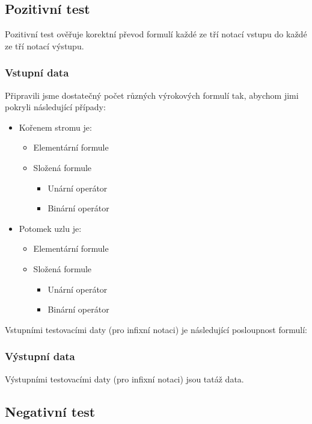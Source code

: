 \documentclass[thesis=B,czech,hidelinks]{thesis}[2012/06/26]
\begin{document}
\subsection{Pozitivní test}

Pozitivní test ověřuje korektní převod formulí každé ze tří notací vstupu do každé ze tří notací výstupu.

\subsubsection{Vstupní data}

Připravili jsme dostatečný počet různých výrokových formulí tak, abychom jimi pokryli následující případy:

\begin{itemize}
	\item Kořenem stromu je:
	\begin{itemize}
		\item Elementární formule
		\item Složená formule
		\begin{itemize}
			\item Unární operátor
			\item Binární operátor
		\end{itemize}
	\end{itemize}
	\item Potomek uzlu je:
	\begin{itemize}
		\item Elementární formule
		\item Složená formule
		\begin{itemize}
			\item Unární operátor
			\item Binární operátor
		\end{itemize}
	\end{itemize}
\end{itemize}

Vstupními testovacími daty (pro infixní notaci) je následující posloupnost formulí:


\subsubsection{Výstupní data}

Výstupními testovacími daty (pro infixní notaci) jsou tatáž data.

\subsection{Negativní test}
\end{document}
